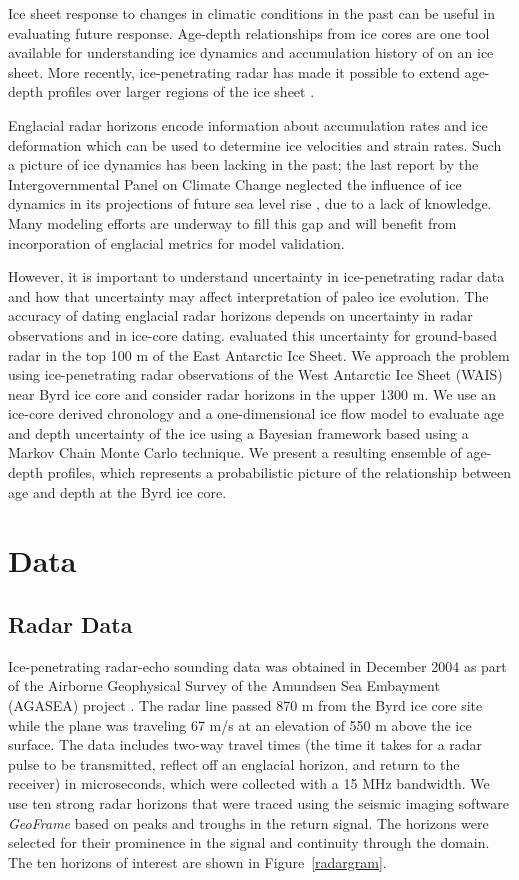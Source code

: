 \documentclass[12pt]{article}
\begin{document}
Ice sheet response to changes in climatic conditions in the past can be useful in evaluating future response. Age-depth relationships from ice cores are one tool available for understanding ice dynamics and accumulation history of on an ice sheet. More recently, ice-penetrating radar has made it possible to extend age-depth profiles over larger regions of the ice sheet \citep[e.g.][]{neumann2008,holt2006}.

Englacial radar horizons encode information about accumulation rates and ice deformation which can be used to determine ice velocities and strain rates. Such a picture of ice dynamics has been lacking in the past; the last report by the Intergovernmental Panel on Climate Change neglected the influence of ice dynamics in its projections of future sea level rise \citep{ipcc2007}, due to a lack of knowledge. Many modeling efforts are underway to fill this gap and will benefit from incorporation of englacial metrics for model validation.

However, it is important to understand uncertainty in ice-penetrating radar data and how that uncertainty may affect interpretation of paleo ice evolution. The accuracy of dating englacial radar horizons depends on uncertainty in radar observations and in ice-core dating. \cite{eisen2004} evaluated this uncertainty for ground-based radar in the top 100 m of the East Antarctic Ice Sheet. We approach the problem using ice-penetrating radar observations of the West Antarctic Ice Sheet (WAIS) near Byrd ice core and consider radar horizons in the upper 1300 m.  We use an ice-core derived chronology and a one-dimensional ice flow model to evaluate age and depth uncertainty of the ice using a Bayesian framework based using a Markov Chain Monte Carlo technique. We present a resulting ensemble of age-depth profiles, which represents a probabilistic picture of the relationship between age and depth at the Byrd ice core.

\section{Data}

\subsection{Radar Data}
Ice-penetrating radar-echo sounding data was obtained in December 2004 as part of the Airborne Geophysical Survey of the Amundsen Sea Embayment (AGASEA) project \citep{holt2006}. The radar line passed 870 m from the Byrd ice core site while the plane was traveling 67 m/s at an elevation of 550 m above the ice surface. The data includes two-way travel times (the time it takes for a radar pulse to be transmitted, reflect off an englacial horizon, and return to the receiver) in microseconds, which were collected with a 15 MHz bandwidth. We use ten strong radar horizons that were traced using the seismic imaging software \textit{GeoFrame} based on peaks and troughs in the return signal. The horizons were selected for their prominence in the signal and continuity through the domain. The ten horizons of interest are shown in Figure~\ref{radargram}.
\end{document}

